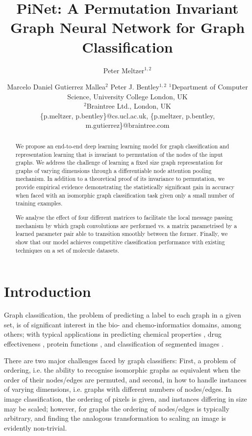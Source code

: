 \documentclass{article}
\title{PiNet: A Permutation Invariant Graph Neural Network for Graph Classification}
\author{
  Peter Meltzer$^{1,2}$
\and
Marcelo Daniel Gutierrez Mallea$^2$\And
Peter J. Bentley$^{1,2}$
\affiliations
$^1$Department of Computer Science, University College London, UK\\
$^2$Braintree Ltd., London, UK\\
\emails
\{p.meltzer, p.bentley\}@cs.ucl.ac.uk,
\{p.meltzer, p.bentley, m.gutierrez\}@braintree.com
}
\theoremstyle{definition}
\begin{document}
\maketitle

\begin{abstract}
We propose an end-to-end deep learning learning model for graph classification and representation learning that is invariant to permutation of the nodes of the input graphs. We address the challenge of learning a fixed size graph representation for graphs of varying dimensions through a differentiable node attention pooling mechanism. In addition to a theoretical proof of its invariance to permutation, we provide empirical evidence demonstrating the statistically significant gain in accuracy when faced with an isomorphic graph classification task given only a small number of training examples.
  
We analyse the effect of four different matrices to facilitate the local message passing mechanism by which graph convolutions are performed vs. a matrix parametrised by a learned parameter pair able to transition smoothly between the former. Finally, we show that our model achieves competitive classification performance with existing techniques on a set of molecule datasets.
\end{abstract}

\section{Introduction}

Graph classification, the problem of predicting a label to each graph in a given set, is of significant interest in the bio- and chemo-informatics domains, among others; with typical applications in predicting chemical properties \cite{Li2016}, drug effectiveness \cite{Bunke2009}, protein functions \cite{Shervashidze2009}, and classification of segmented images \cite{Scarselli2009}.

There are two major challenges faced by graph classifiers: First, a problem of ordering, i.e. the ability to recognise isomorphic graphs as equivalent when the order of their nodes/edges are permuted, and second, in how to handle instances of varying dimensions, i.e. graphs with different numbers of nodes/edges. In image classification, the ordering of pixels is given, and instances differing in size may be scaled; however, for graphs the ordering of nodes/edges is typically arbitrary, and finding the analogous transformation to scaling an image is evidently non-trivial.
\end{document}
